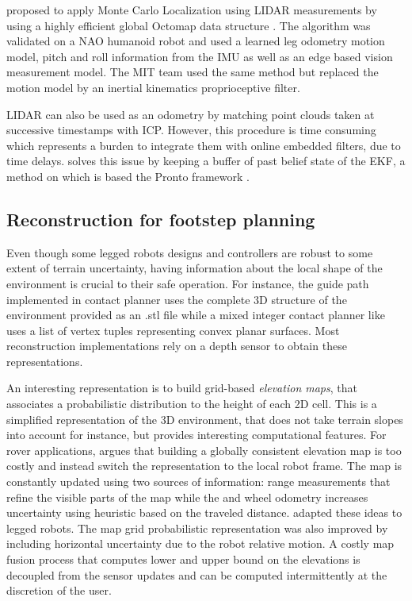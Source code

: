 \cite{hornung2014monte} proposed to apply Monte Carlo Localization using LIDAR measurements by using a highly efficient global Octomap data structure \cite{hornung2013octomap}.
The algorithm was validated on a NAO humanoid robot and used a learned leg odometry motion model, pitch and roll information from the IMU as well as an edge based vision measurement model.
The MIT team \cite{fallon2014drift} used the same method but replaced the motion model by an inertial kinematics proprioceptive filter. 

LIDAR can also be used as an odometry by matching point clouds taken at successive timestamps with ICP. However, this procedure is time consuming 
which represents a burden to integrate them with online embedded filters, due to time delays. \cite{nobili2017heterogeneous} solves this issue by keeping a
buffer of past belief state of the EKF, a method on which is based the Pronto framework \cite{camurri2020pronto}.



\subsection{Reconstruction for footstep planning}
Even though some legged robots designs and controllers \cite{reher2019dynamic, bledt2018cheetah} are robust to some extent of terrain uncertainty, having information about the local
shape of the environment is crucial to their safe operation. For instance, the guide path implemented in contact planner \cite{tonneau2018efficient} uses the complete 3D structure of the environment
provided as an .stl file while a mixed integer contact planner like \cite{tonneau2020sl1m} uses a list of vertex tuples representing convex planar surfaces.
Most reconstruction implementations rely on a depth sensor to obtain these representations.

An interesting representation is to build grid-based \textit{elevation maps}, that associates a probabilistic distribution to the height of each 2D cell. 
This is a simplified representation of the 3D environment, that does not take terrain slopes into account for instance, but provides interesting computational features. 
For rover applications, \cite{kleiner2007real} argues that building a globally consistent elevation map is too costly and instead switch the representation to the local robot frame. 
The map is constantly updated using two sources of information: range measurements that refine the visible parts of the map while the and wheel odometry increases uncertainty using heuristic
based on the traveled distance. \cite{fankhauser2014robot, fankhauser2018probabilistic} adapted these ideas to legged robots. The map grid probabilistic representation
was also improved by including horizontal uncertainty due to the robot relative motion. A costly map fusion process that computes lower and upper bound on the elevations
is decoupled from the sensor updates and can be computed intermittently at the discretion of the user. 

